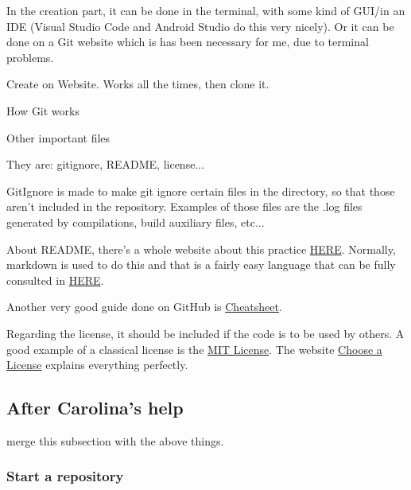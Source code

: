 \par In the creation part, it can be done in the terminal, with some kind of GUI/in an IDE (Visual Studio Code and Android Studio do this very nicely). Or it can be done on a Git website which is has been necessary for me, due to terminal problems.

\par Create on Website. Works all the times, then clone it.
\vspace{.5cm}


{\large How Git works}
\vspace{.5cm}


\vspace{.5cm}

{\large Other important files}

\vspace{.5cm}
\par They are: gitignore, README, license...

\par GitIgnore is made to make git ignore certain files in the directory, so that those aren't included in the repository. Examples of those files are the .log files generated by compilations, build auxiliary files, etc...

\par About README, there's a whole website about this practice \href{https://www.makeareadme.com/}{HERE}. Normally, markdown is used to do this and that is a fairly easy language that can be fully consulted in \href{https://commonmark.org/help/}{HERE}.
\par Another very good guide done on GitHub is \href{https://github.com/adam-p/markdown-here/wiki/Markdown-Cheatsheet}{Cheatsheet}.

\par Regarding the license, it should be included if the code is to be used by others. A good example of a classical license is the \href{https://choosealicense.com/licenses/mit/}{MIT License}. The website \href{https://choosealicense.com}{Choose a License} explains everything perfectly.


\subsection{After Carolina's help}
merge this subsection with the above things.

\subsubsection{Start a repository}

